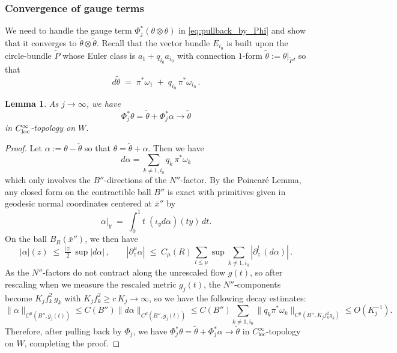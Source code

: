 \documentclass[11pt]{amsart}
\theoremstyle{plain}
\numberwithin{equation}{section}
\newtheorem{lemma}[theorem]{Lemma}
\theoremstyle{definition}
\theoremstyle{remark}
\begin{document}
\subsubsection{Convergence of gauge terms}
We need to handle the gauge term $\Phi_j^*(\theta \otimes \theta)$ in \eqref{eq:pullback_by_Phi} and show that it converges to $\widetilde{\theta} \otimes \widetilde{\theta}$. Recall that the vector bundle $E_{i_0}$ is built upon the circle-bundle $\widetilde{P}$ whose Euler class is $a_1 + q_{i_0}a_{i_0}$ with connection $1$-form $\tilde{\theta} := \theta\big|_{\widetilde{P}}$, so that
\[d \widetilde{\theta} \;=\; \pi^*\omega_1 \;+\; q_{i_0} \, \pi^*\omega_{i_0} \,.\]
\begin{lemma}
\label{lma:gauge}
As $j \to \infty$, we have
\begin{equation}
\label{eq:Phi_jtheta}
\Phi_j^*\theta = \widetilde{\theta} + \Phi_j^*\alpha \to \widetilde\theta
\end{equation}
in $C^\infty_{\textup{loc}}$-topology on $W$.	
\end{lemma}
\begin{proof}
Let $\alpha := \theta - \widetilde{\theta}$ so that $\theta = \widetilde{\theta} + \alpha$. Then we have
\[d\alpha = \sum_{k \neq 1, i_0} q_k \, \pi^* \omega_k\]
which only involves the $B''$-directions of the $N''$-factor. By the Poincar\'e Lemma, any closed form on the contractible ball $B''$ is exact with primitives given in geodesic normal coordinates centered at $\bar{x}''$ by
\begin{equation*}
\alpha \big|_y \;=\; \int_0^1 t \; (\iota_y  d\alpha)( t y ) \, d t.
\end{equation*}
On the ball $B_R(\bar{x}'')$, we then have
\begin{equation*}
| \alpha | ( z ) \;\leq\; \tfrac{| z |}{2} \, \sup |d\alpha|  \,, \qquad | \partial_z^{\mu} \alpha | \;\leq\; C_{\mu} ( R ) \, \textstyle\sum_{l \leq \mu} \sup \sum_{k\not=1,i_0}| \partial_z^{l} \, (d\alpha) | \,.
\end{equation*}
As the $N''$-factors do not contract along the unrescaled flow $g(t)$, so after rescaling when we measure the rescaled metric $g_j(t)$, the $N''$-components become $K_j f_k^2 \, g_k$ with $K_j f_k^2 \geq c \, K_j \to \infty$, so we have the following decay estimates:
\[\|\alpha\|_{C^\mu(B'',g_j(t))} \leq C(B'')\| d \alpha \|_{C^\mu(B'',g_j(t))} \leq C(B'')\sum_{k\not=1,i_0} \|q_k\pi^*\omega_k\|_{C^\mu(B'', K_j f_k^2 g_k)} \leq O ( K_j^{-1} ).\]
Therefore, after pulling back by $\Phi_j$, we have $\Phi_j^*\theta = \widetilde{\theta} + \Phi_j^*\alpha \to \widetilde\theta$ in $C^\infty_{\textrm{loc}}$-topology on $W$, completing the proof.
\end{proof}
\end{document}
